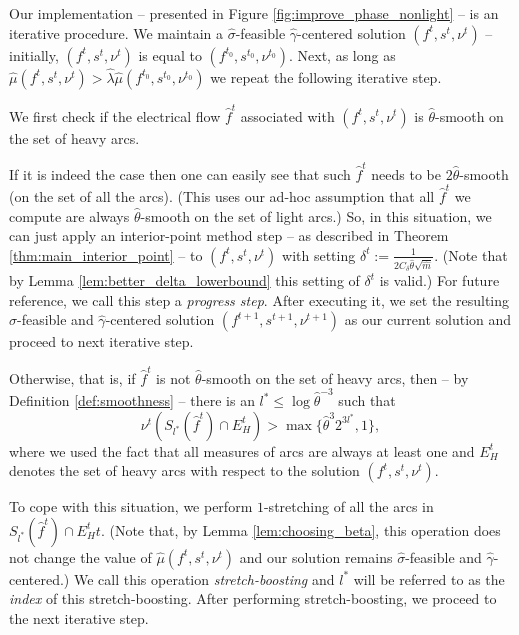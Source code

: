 \documentclass[11pt, letterpaper]{article}
\newcommand{\cdelta}{C_{\delta}}
\newcommand{\hm}{\widehat{m}}
\newcommand{\Cset}[2]{S_{#1}(#2)}
\newcommand{\hmu}{\hat{\mu}}
\newcommand{\hgamma}{\hat{\gamma}}
\newcommand{\htheta}{\hat{\theta}}
\newcommand{\hlambda}{\hat{\lambda}}
\newcommand{\vnu}{\boldsymbol{\mathit{\nu}}}
\newcommand{\hvsigma}{\boldsymbol{\mathit{\hat{\sigma}}}}
\newcommand{\ff}{\boldsymbol{\mathit{f}}}
\newcommand{\hff}{\boldsymbol{\mathit{\hat{f}}}}
\renewcommand{\ss}{\boldsymbol{\mathit{s}}}
\begin{document}
Our implementation -- presented in Figure \ref{fig:improve_phase_nonlight} -- is an iterative procedure. We maintain a $\hvsigma$-feasible $\hgamma$-centered solution $(\ff^t,\ss^t,\vnu^t)$ -- initially, $(\ff^t,\ss^t,\vnu^t)$ is equal to $(\ff^{t_0},\ss^{t_0},\vnu^{t_0})$. Next, as long as $\hmu(\ff^t,\ss^t,\vnu^t)> \hlambda \hmu(\ff^{t_0},\ss^{t_0},\vnu^{t_0})$ we repeat the following iterative step. 

We first check if the electrical flow $\hff^t$ associated with $(\ff^t,\ss^t,\vnu^t)$ is $\htheta$-smooth on the set of heavy arcs. 

If it is indeed the case then one can easily see that such $\hff^t$ needs to be $2\htheta$-smooth (on the set of all the arcs). (This uses our ad-hoc assumption that all $\hff^t$ we compute are always $\htheta$-smooth on the set of light arcs.) So, in this situation, we can just apply an interior-point method step -- as described in Theorem \ref{thm:main_interior_point} -- to $(\ff^t,\ss^t,\vnu^t)$ with setting $\delta^t:=\frac{1}{2\cdelta \htheta \sqrt{\hm}}$. (Note that by Lemma \ref{lem:better_delta_lowerbound} this setting of $\delta^t$ is valid.)  For future reference, we call this step a {\em progress step}. After executing it, we set the resulting $\hvsigma$-feasible and $\hgamma$-centered solution $(\ff^{t+1},\ss^{t+1},\vnu^{t+1})$ as our current solution and proceed to next iterative step. 

Otherwise, that is, if $\hff^t$ is not $\htheta$-smooth on the set of heavy arcs, then -- by Definition \ref{def:smoothness} -- there is an $l^*\leq \log \htheta^{-3}$ such that 
\begin{equation}
\label{eq:boosting_condition}
\vnu^t(\Cset{l^*}{\hff^t}\cap E_{H}^t)> \max\{\htheta^3 2^{3l^*},1\},
\end{equation}
where we used the fact that all measures of arcs are always at least one and $E_{H}^t$ denotes the set of heavy arcs with respect to the solution $(\ff^t,\ss^t,\vnu^t)$. 

To cope with this situation, we perform $1$-stretching of all the arcs in $\Cset{l^*}{\hff^t}\cap E_{H}^tt$. (Note that, by Lemma \ref{lem:choosing_beta}, this operation does not change the value of $\hmu(\ff^t,\ss^t,\vnu^t)$ and our solution remains $\hvsigma$-feasible and $\hgamma$-centered.) We call this operation {\em stretch-boosting} and $l^*$ will be referred to as the {\em index} of this stretch-boosting. After performing stretch-boosting, we proceed to the next iterative step. 
\end{document}
